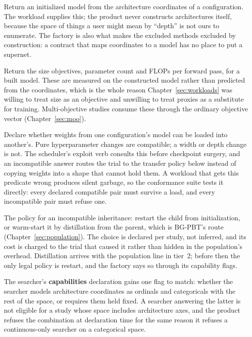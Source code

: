 \begin{description}[style=nextline, leftmargin=1.6em, itemsep=2pt]
\item[build(config)] Return an initialized model from the
architecture coordinates of a configuration. The workload supplies
this; the product never constructs architectures itself, because the
space of things a user might mean by ``depth'' is not ours to
enumerate. The factory is also what makes the excluded methods
excluded by construction: a contract that maps coordinates to a model
has no place to put a supernet.
\item[measure(model)] Return the size objectives, parameter count and
FLOPs per forward pass, for a built model. These are measured on the
constructed model rather than predicted from the coordinates, which
is the whole reason Chapter~\ref{sec:workloads} was willing to treat
size as an objective and unwilling to treat proxies as a substitute
for training. Multi-objective studies consume these through the
ordinary objective vector (Chapter~\ref{sec:moo}).
\item[compatible(config$_a$, config$_b$)] Declare whether weights
from one configuration's model can be loaded into another's. Pure
hyperparameter changes are compatible; a width or depth change is
not. The scheduler's exploit verb consults this before checkpoint
surgery, and an incompatible answer routes the trial to the transfer
policy below instead of copying weights into a shape that cannot hold
them. A workload that gets this predicate wrong produces silent
garbage, so the conformance suite tests it directly: every declared
compatible pair must survive a load, and every incompatible pair must
refuse one.
\item[transfer(parent, child)] The policy for an incompatible
inheritance: restart the child from initialization, or warm-start it
by distillation from the parent, which is BG-PBT's route
(Chapter~\ref{sec:population}). The choice is declared per study, not
inferred, and its cost is charged to the trial that caused it rather
than hidden in the population's overhead. Distillation arrives with
the population line in tier~2; before then the only legal policy is
restart, and the factory says so through its capability flags.
\end{description}

The searcher's \textbf{capabilities} declaration gains one flag to
match: whether the searcher models architecture coordinates as
ordinals and categoricals with the rest of the space, or requires
them held fixed. A searcher answering the latter is not eligible for
a study whose space includes architecture axes, and the product
refuses the combination at declaration time for the same reason it
refuses a continuous-only searcher on a categorical space.

